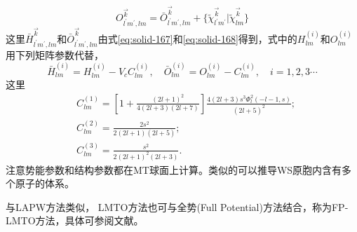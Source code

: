 \begin{equation}
  O_{l^{\prime}m^{\prime},lm}^{\vec k}=\bar O_{l^{\prime}m^{\prime},lm}^{\vec k}+\{\tilde\chi_{l^{\prime}m^{\prime}}^{\vec k}|\tilde\chi_{lm}^{\vec k}\}
  \label{eq:solid-183}
\end{equation}
这里$\bar H_{l^{\prime}m^{\prime},lm}^{\vec k}$和$\bar O_{l^{\prime}m^{\prime},lm}^{\vec k}$由式\eqref{eq:solid-167}和\eqref{eq:solid-168}得到，式中的$H_{lm}^{(i)}$和$O_{lm}^{(i)}$用下列矩阵参数代替，
$$\bar H_{lm}^{(i)}=H_{lm}^{(i)}-V_cC_{lm}^{(i)},\quad\bar O_{lm}^{(i)}=O_{lm}^{(i)}-C_{lm}^{(i)},\quad i=1,2,3\cdots$$
这里
\begin{equation}
  \begin{split}
    &C_{lm}^{(1)}=\left[1+\frac{(2l+1)^2}{4(2l+3)(2l+7)}\right]\frac{4(2l+3)s^3\Phi_l^2(-l-1,s)}{(2l+5)^2};\\
    &C_{lm}^{(2)}=\frac{2s^2}{2(2l+1)(2l+5)};\\
    &C_{lm}^{(3)}=\frac{s^2}{2(2l+1)^2(2l+3)}.
  \end{split}
  \label{eq:solid-184}
\end{equation}
注意势能参数和结构参数都在MT球面上计算。类似的可以推导WS原胞内含有多个原子的体系\cite{Nemoshkalenko-Antonov}。

与LAPW方法类似，%
LMTO方法也可与全势(Full Potential)方法结合，称为FP-LMTO方法，具体可参阅文献。%

